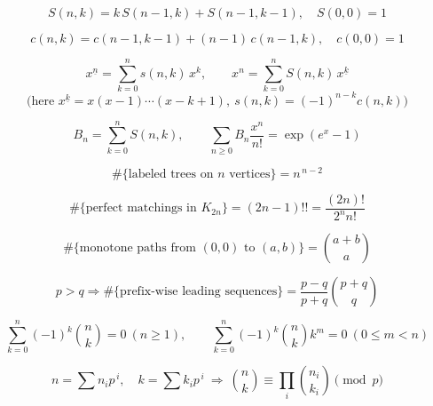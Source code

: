 \[
S(n,k)=k\,S(n-1,k)+S(n-1,k-1),\quad S(0,0)=1
\]

\[
c(n,k)=c(n-1,k-1)+(n-1)\,c(n-1,k),\quad c(0,0)=1
\]

\[
x^{\underline{n}}=\sum_{k=0}^{n} s(n,k)\,x^{k},
\qquad
x^{n}=\sum_{k=0}^{n} S(n,k)\,x^{\underline{k}}
\]
\[
\text{(here }x^{\underline{k}}=x(x-1)\cdots(x-k+1),\ s(n,k)=(-1)^{n-k}c(n,k)\text{)}
\]

\[
B_n=\sum_{k=0}^{n} S(n,k),
\qquad
\sum_{n\ge 0} B_n\frac{x^n}{n!}=\exp(e^{x}-1)
\]

\[
\#\{\text{labeled trees on }n\text{ vertices}\}=n^{\,n-2}
\]

\[
\#\{\text{perfect matchings in }K_{2n}\}=(2n-1)!!=\frac{(2n)!}{2^{n}n!}
\]

\[
\#\{\text{monotone paths from }(0,0)\text{ to }(a,b)\}=\binom{a+b}{a}
\]

\[
p>q\Rightarrow
\#\{\text{prefix-wise leading sequences}\}=\frac{p-q}{p+q}\binom{p+q}{q}
\]

\[
\sum_{k=0}^{n}(-1)^k\binom{n}{k}=0\ (n\ge 1),
\qquad
\sum_{k=0}^{n}(-1)^k\binom{n}{k}k^{m}=0\ (0\le m<n)
\]

\[
n=\sum n_i p^{\,i},\quad k=\sum k_i p^{\,i}
\ \Rightarrow\
\binom{n}{k}\equiv \prod_i \binom{n_i}{k_i}\pmod p
\]
